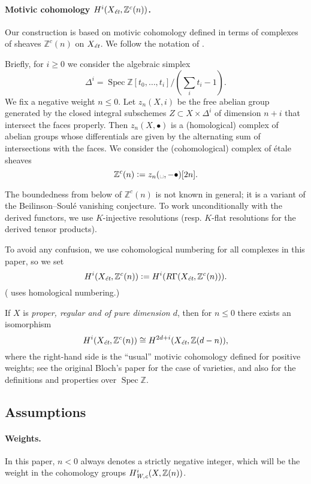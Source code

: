 \documentclass[leqno,12pt]{article}
\theoremstyle{plain}
\theoremstyle{definition}
\DeclareMathOperator{\Spec}{Spec}
\newcommand{\ZZ}{\mathbb{Z}}
\newcommand{\dfn}{\mathrel{\mathop:}=}
\newcommand{\Wc}{\text{\it W,c}}
\newcommand{\et}{\text{\it \'{e}t}}
\begin{document}
\paragraph{Motivic cohomology $H^i (X_\et, \ZZ^c (n))$.}
Our construction is based on motivic cohomology defined in terms of complexes
of sheaves $\ZZ^c (n)$ on $X_\et$. We follow the notation of
\cite{Geisser-2010}.

Briefly, for $i \ge 0$ we consider the algebraic simplex
$$\Delta^i = \Spec \ZZ[t_0,\ldots,t_i]/(\sum_i t_i - 1).$$
We fix a negative weight $n \le 0$. Let $z_n (X,i)$ be the free abelian group
generated by the closed integral subschemes $Z \subset X \times \Delta^i$ of
dimension $n + i$ that intersect the faces properly. Then $z_n (X, \bullet)$ is
a (homological) complex of abelian groups whose differentials are given by the
alternating sum of intersections with the faces. We consider the (cohomological)
complex of \'{e}tale sheaves
$$\ZZ^c (n) \dfn z_n (\text{\textvisiblespace}, -\bullet) [2n].$$

The boundedness from below of $\ZZ^c(n)$ is not known in general; it is a
variant of the Beilinson--Soul\'{e} vanishing conjecture. To work
unconditionally with the derived functors, we use $K$-injective resolutions
\cite{Spaltenstein-1988,Serpe-2003} (resp. $K$-flat resolutions for the derived
tensor products).

To avoid any confusion, we use cohomological numbering for all complexes
in this paper, so we set
$$H^i (X_\et, \ZZ^c(n)) \dfn H^i (R\Gamma (X_\et, \ZZ^c(n))).$$
(\cite{Geisser-2010} uses homological numbering.)

If $X$ is \emph{proper, regular and of pure dimension $d$}, then for $n \le 0$
there exists an isomorphism
\begin{equation}
  \label{eqn:Zc(n)-vs-Z(d-n)}
  H^i (X_\et, \ZZ^c(n)) \cong H^{2d+i} (X_\et, \ZZ (d-n)),
\end{equation}
where the right-hand side is the ``usual'' motivic cohomology defined for
positive weights; see the original Bloch's paper \cite{Bloch-1986} for the case
of varieties, and also \cite{Geisser-2004-Dedekind,Geisser-2005} for the
definitions and properties over $\Spec \ZZ$.

\subsection*{Assumptions}

\paragraph{Weights.}
In this paper, $n < 0$ always denotes a strictly negative integer,
which will be the weight in the cohomology groups $H^i_\Wc (X, \ZZ(n))$.
\end{document}
